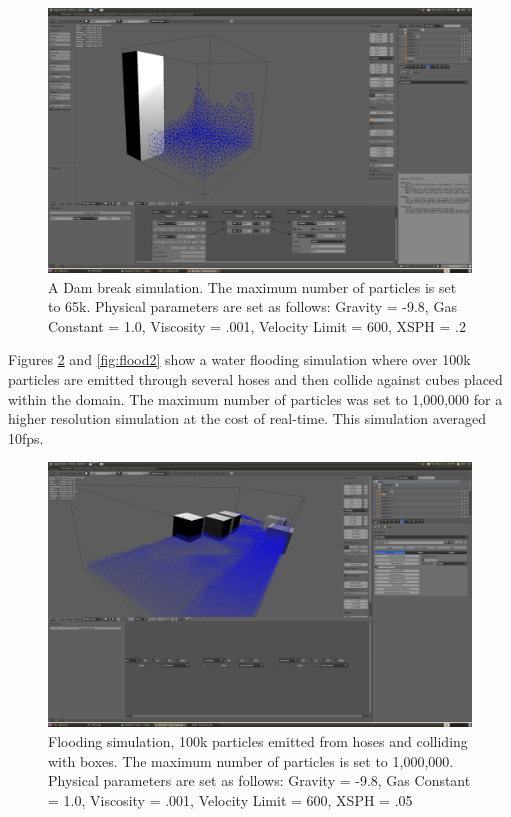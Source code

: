 {%
\begin{figure}[!htc]
		\includegraphics[scale=0.4]{figures/dam_break.png}
        \caption{ A Dam break simulation. The maximum number of particles is set to 65k.
        Physical parameters are set as follows: Gravity = -9.8, Gas
        Constant = 1.0, Viscosity = .001, Velocity Limit = 600, XSPH = .2}
		\label{fig:dam_break}
\end{figure}

\pagebreak
\clearpage

Figures \ref{fig:flood1} and \ref{fig:flood2} show a water flooding simulation where
over 100k particles are emitted through several hoses and then collide against
cubes placed within the domain. The maximum number of particles was set to
1,000,000 for a higher resolution simulation at the cost of real-time. This
simulation averaged 10fps.


\begin{figure}[!htc]
		\includegraphics[scale=0.4]{figures/flood1.png}
        \caption{ Flooding simulation, 100k particles emitted from hoses and
        colliding with boxes. The maximum number of particles is set to
        1,000,000. Physical parameters are set as follows: Gravity = -9.8, Gas
        Constant = 1.0, Viscosity = .001, Velocity Limit = 600, XSPH = .05}
		\label{fig:flood1}
\end{figure}

}
